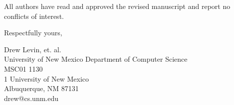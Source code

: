 \documentclass[10pt]{article}
\begin{document}

All authors have read and approved the revised manuscript and report no conflicts of interest. 

\begin{flushleft}Respectfully yours,\end{flushleft} 

\noindent Drew Levin, et. al. \\
University of New Mexico Department of Computer Science \\
MSC01 1130 \\
1 University of New Mexico \\
Albuquerque, NM 87131 \\
drew@cs.unm.edu
\end{document}
